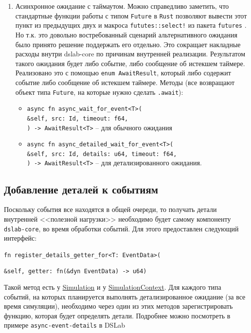 \begin{enumerate}
\begin{itemize}
    \end{itemize}
    \item Асинхронное ожидание с таймаутом. Можно справедливо заметить, что стандартные функции работы с типом \texttt{Future} в \texttt{Rust} позволяют вывести этот пункт из предыдущих двух и макроса \texttt{fututes::select!} из пакета \texttt{futures} \cite{rust-futures}. Но т.к. это довольно востребованный сценарий альтернативного ожидания было принято решение поддержать его отдельно. Это сокращает накладные расходы внутри dslab-core по причинам внутренней реализации. Результатом такого ожидания будет либо событие, либо сообщение об истекшем таймере. Реализовано это с помощью \texttt{enum AwaitResult}, который либо содержит событие либо сообщение об истекшем таймере. Методы (все возвращают объект типа \texttt{Future}, на которые нужно сделать \texttt{.await}):
    \begin{itemize}
        \item \texttt{async fn async\_wait\_for\_event<T>(\\\&self, src: Id, timeout: f64,\\) -> AwaitResult<T>} -- для обычного ожидания
        \item \texttt{async fn async\_detailed\_wait\_for\_event<T>(\\\&self, src: Id, details: u64, timeout: f64,\\) -> AwaitResult<T>} -- для детализированного ожидания. 
    \end{itemize}
\end{enumerate}

\subsection{Добавление деталей к событиям}\label{add-details-getters}

Поскольку события все находятся в общей очереди, то получать детали внутренней <<полезной нагрузки>> необходимо будет самому компоненту \texttt{dslab-core}, во время обработки событий. Для этого предоставлен следующий интерфейс:
\begin{flushleft}
     \texttt{fn register\_details\_getter\_for<T: EventData>(}
\end{flushleft}
\vspace{-1.2cm}
\begin{flushright}
      \texttt{\&self, getter: fn(\&dyn EventData) -> u64)}
\end{flushright}

Такой метод есть у \hyperref[Simulation]{Simulation} и у \hyperref[SimulationContext]{SimulationContext}. Для каждого типа событий, на которых планируется выполнять детализированное ожидание (за все время симуляции), необходимо через один из этих методов зарегистрировать функцию, которая будет определять детали. Подробнее можно посмотреть в примере \texttt{async-event-details} в DSLab \cite{async-event-details-example}

